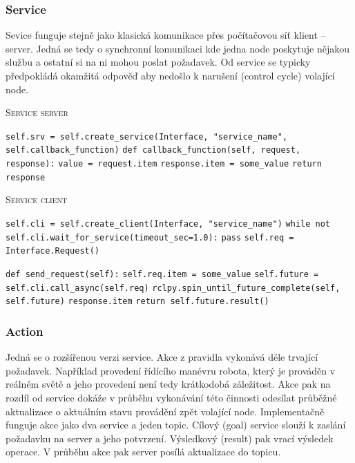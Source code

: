 \subsubsection*{Service}
Sevice funguje stejně jako klasická komunikace přes počítačovou síť klient -- server. Jedná se tedy o synchronní komunikaci kde jedna node poskytuje nějakou službu a ostatní si na ni mohou poslat požadavek. Od service se typicky předpokládá okamžitá odpověď aby nedošlo k narušení (control cycle) volající node. \cite{ros2_introduction}

\begin{algorithm}[h!]
	\label{}
	\caption{\textsc{Service server}}
	
	\DontPrintSemicolon
	\SetAlgoNoLine
	\SetNlSty{}{}{:}
	\SetNlSkip{-1.1em}
	
	\BlankLine \Indp\Indpp
	
	\texttt{self.srv = self.create\_service(Interface, "service\_name", self.callback\_function)}\;
	\BlankLine
	\texttt{def callback\_function(self, request, response):}\;
	\Indp\Indp
	\texttt{value = request.item}\;
	\texttt{response.item = some\_value}\;
	\texttt{return response}\;
	
\end{algorithm}

\begin{algorithm}[h!]
	\label{}
	\caption{\textsc{Service client}}
	
	\DontPrintSemicolon
	\SetAlgoNoLine
	\SetAlgoNlRelativeSize{-1}
	\SetNlSty{}{}{:}
	\SetNlSkip{-1.1em}
	
	\BlankLine \Indp\Indpp
	
	\texttt{self.cli = self.create\_client(Interface, "service\_name")}\;
	\texttt{while not self.cli.wait\_for\_service(timeout\_sec=1.0):}\;
	\Indp\Indp
	\texttt{pass}\;
	\Indm\Indm
	\texttt{self.req = Interface.Request()}\;

	\BlankLine
	\texttt{def send\_request(self):}\;
	\Indp\Indp
	\texttt{self.req.item = some\_value}\;
	\texttt{self.future = self.cli.call\_async(self.req)}\;
	\texttt{rclpy.spin\_until\_future\_complete(self, self.future)}\;
	\texttt{response.item}\;
	\texttt{return self.future.result()}\;
		
\end{algorithm}

\subsubsection*{Action} %
Jedná se o rozšířenou verzi service. Akce z pravidla vykonává déle trvající požadavek. Například provedení řídícího manévru robota, který je prováděn v reálném světě a jeho provedení není tedy krátkodobá záležitost. Akce pak na rozdíl od service dokáže v průběhu vykonávání této činnosti odesílat průběžné aktualizace o aktuálním stavu provádění zpět volající node. Implementačně funguje akce jako dva service a jeden topic. Cílový (goal) service slouží k zaslání požadavku na server a jeho potvrzení. Výsledkový (result) pak vrací výsledek operace. V průběhu akce pak server posílá aktualizace do topicu.

